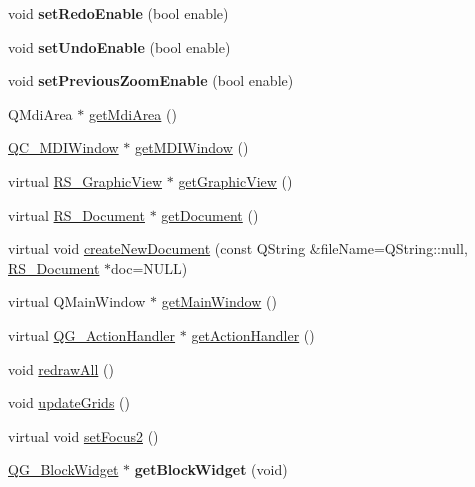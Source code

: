 \begin{DoxyCompactItemize}
\item 
\hypertarget{classQC__ApplicationWindow_a052d9b505f0dbe1406ce6522131f1ca2}{void {\bfseries set\-Redo\-Enable} (bool enable)}\label{classQC__ApplicationWindow_a052d9b505f0dbe1406ce6522131f1ca2}

\item 
\hypertarget{classQC__ApplicationWindow_a226f5b282a3372d3c4339d3f12b3e5b3}{void {\bfseries set\-Undo\-Enable} (bool enable)}\label{classQC__ApplicationWindow_a226f5b282a3372d3c4339d3f12b3e5b3}

\item 
\hypertarget{classQC__ApplicationWindow_a849df5def355a9116b699197e80b534f}{void {\bfseries set\-Previous\-Zoom\-Enable} (bool enable)}\label{classQC__ApplicationWindow_a849df5def355a9116b699197e80b534f}

\item 
Q\-Mdi\-Area $\ast$ \hyperlink{classQC__ApplicationWindow_aae14eadd8f0df856a9c945b4c04e2d39}{get\-Mdi\-Area} ()
\item 
\hyperlink{classQC__MDIWindow}{Q\-C\-\_\-\-M\-D\-I\-Window} $\ast$ \hyperlink{classQC__ApplicationWindow_a5c24986126bcb08143b1dc53749b6768}{get\-M\-D\-I\-Window} ()
\item 
virtual \hyperlink{classRS__GraphicView}{R\-S\-\_\-\-Graphic\-View} $\ast$ \hyperlink{classQC__ApplicationWindow_a10a648f0dd42830bf3d7ca6542791f97}{get\-Graphic\-View} ()
\item 
virtual \hyperlink{classRS__Document}{R\-S\-\_\-\-Document} $\ast$ \hyperlink{classQC__ApplicationWindow_a359d498aee01834b990d03202f180d0e}{get\-Document} ()
\item 
virtual void \hyperlink{classQC__ApplicationWindow_a683fa16eaf648a9d55aeb6ce65ab03d0}{create\-New\-Document} (const Q\-String \&file\-Name=Q\-String\-::null, \hyperlink{classRS__Document}{R\-S\-\_\-\-Document} $\ast$doc=N\-U\-L\-L)
\item 
virtual Q\-Main\-Window $\ast$ \hyperlink{classQC__ApplicationWindow_af2a5b4bd29209c13935713759fb286fd}{get\-Main\-Window} ()
\item 
virtual \hyperlink{classQG__ActionHandler}{Q\-G\-\_\-\-Action\-Handler} $\ast$ \hyperlink{classQC__ApplicationWindow_a0bd256945def209bcad8ec3a2fe24be9}{get\-Action\-Handler} ()
\item 
void \hyperlink{classQC__ApplicationWindow_a67a948fb923a65bda610e130f1aa683a}{redraw\-All} ()
\item 
void \hyperlink{classQC__ApplicationWindow_a90cdfbe65972e22b99fefbc13cad93bf}{update\-Grids} ()
\item 
virtual void \hyperlink{classQC__ApplicationWindow_abda7a8fb77da7e662e9525c4bc5e28ce}{set\-Focus2} ()
\item 
\hypertarget{classQC__ApplicationWindow_a2fd0dc7ea81e85d5b1f3a106585defe3}{\hyperlink{classQG__BlockWidget}{Q\-G\-\_\-\-Block\-Widget} $\ast$ {\bfseries get\-Block\-Widget} (void)}\label{classQC__ApplicationWindow_a2fd0dc7ea81e85d5b1f3a106585defe3}

\end{DoxyCompactItemize}
